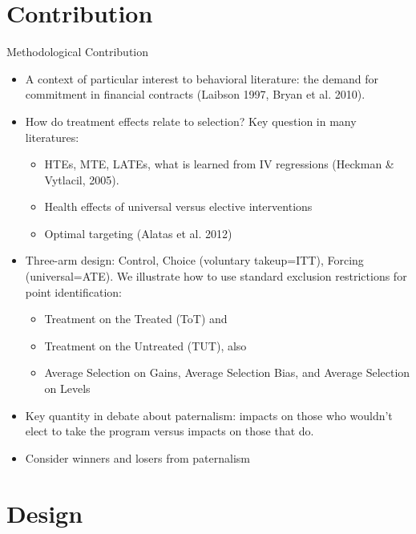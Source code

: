 \documentclass[8pt]{beamer}
\begin{document}
\section{Contribution}

\begin{frame}{Methodological Contribution}
\begin{itemize}
 \vfill \item A context of particular interest to behavioral literature:  the demand for commitment in financial contracts (Laibson 1997, Bryan et al. 2010).
 
   \vfill \pause  \item How do treatment effects relate to selection?  Key question in many literatures:
	\begin{itemize} 
		\item HTEs, MTE, LATEs, what is learned from IV regressions (Heckman \& Vytlacil, 2005).
		\item Health effects of universal versus elective interventions
		\item Optimal targeting (Alatas et al. 2012)
	\end{itemize}
    
    
  \vfill \pause  \item Three-arm design:  Control, Choice (voluntary takeup=ITT), Forcing (universal=ATE).  We illustrate how to use standard exclusion restrictions for point identification:
    \begin{itemize}
        \item Treatment on the Treated (ToT) and 
        \item Treatment on the Untreated (TUT), also
	\item Average Selection on Gains, Average Selection Bias, and Average Selection on Levels
    \end{itemize} 
    
  
     \vfill \pause  \item Key quantity in debate about paternalism:  impacts on those who wouldn't elect to take the program versus impacts on those that do.
    
   \vfill   \pause  \item Consider winners and losers from paternalism 
\end{itemize}
\end{frame}




\section{Design}
\end{document}
